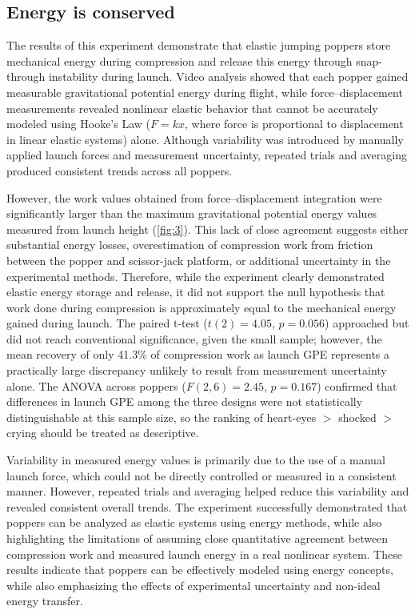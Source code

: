 \documentclass[reprint,amsmath,amssymb,aps,twoside]{revtex4-2} %
\begin{document}
\subsection{Energy is conserved}
The results of this experiment demonstrate that elastic jumping poppers store mechanical energy during compression and release this energy through snap-through instability during launch. Video analysis showed that each popper gained measurable gravitational potential energy during flight, while force--displacement measurements revealed nonlinear elastic behavior that cannot be accurately modeled using Hooke's Law ($F = kx$, where force is proportional to displacement in linear elastic systems) alone. Although variability was introduced by manually applied launch forces and measurement uncertainty, repeated trials and averaging produced consistent trends across all poppers. 

However, the work values obtained from force--displacement integration were significantly larger than the maximum gravitational potential energy values measured from launch height (\cref{fig:3}). This lack of close agreement suggests either substantial energy losses, overestimation of compression work from friction between the popper and scissor-jack platform, or additional uncertainty in the experimental methods. Therefore, while the experiment clearly demonstrated elastic energy storage and release, it did not support the null hypothesis that work done during compression is approximately equal to the mechanical energy gained during launch. The paired t-test ($t(2) = 4.05$, $p = 0.056$) approached but did not reach conventional significance, given the small sample; however, the mean recovery of only 41.3\% of compression work as launch GPE represents a practically large discrepancy unlikely to result from measurement uncertainty alone. The ANOVA across poppers ($F(2, 6) = 2.45$, $p = 0.167$) confirmed that differences in launch GPE among the three designs were not statistically distinguishable at this sample size, so the ranking of heart-eyes $>$ shocked $>$ crying should be treated as descriptive.

Variability in measured energy values is primarily due to the use of a manual launch force, which could not be directly controlled or measured in a consistent manner. However, repeated trials and averaging helped reduce this variability and revealed consistent overall trends. The experiment successfully demonstrated that poppers can be analyzed as elastic systems using energy methods, while also highlighting the limitations of assuming close quantitative agreement between compression work and measured launch energy in a real nonlinear system. These results indicate that poppers can be effectively modeled using energy concepts, while also emphasizing the effects of experimental uncertainty and non-ideal energy transfer.
\end{document}
